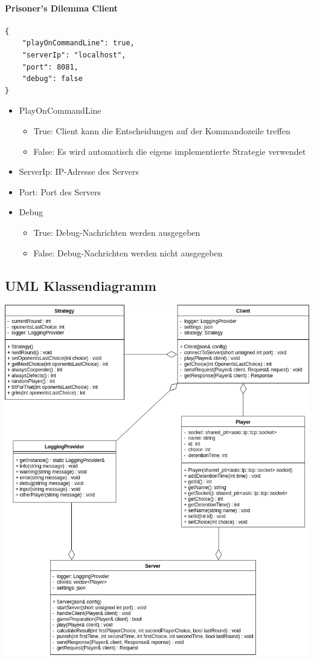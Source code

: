 \documentclass[12pt, letterpaper]{article}
\begin{document}
\paragraph{Prisoner's Dilemma Client}

\begin{verbatim}
{
    "playOnCommandLine": true,
    "serverIp": "localhost",
    "port": 8081,
    "debug": false
}
\end{verbatim}

\begin{itemize}
	\item PlayOnCommandLine
	\begin{itemize}
		\item True: Client kann die Entscheidungen auf der Kommandozeile treffen
		\item False: Es wird automatisch die eigens implementierte Strategie verwendet
	\end{itemize}
	\item ServerIp: IP-Adresse des Servers
	\item Port: Port des Servers
	\item Debug
	\begin{itemize}
		\item True: Debug-Nachrichten werden ausgegeben
		\item False: Debug-Nachrichten werden nicht ausgegeben
	\end{itemize}
\end{itemize}

\subsection{UML Klassendiagramm}

\includegraphics[width=\linewidth]{UML}
\end{document}
